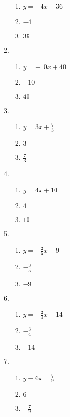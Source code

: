 \documentclass[a4paper,12pt]{article}
\begin{document}
\begin{enumerate}
\begin{multicols}{2}
\begin{enumerate}
\begin{enumerate}
        \item $y = -4x + 36$
        \item $-4$
        \item $36$
        \end{enumerate}
    \item
        \begin{enumerate}
        \item $y = -10x + 40$
        \item $-10$
        \item $40$
        \end{enumerate}
    \item
        \begin{enumerate}
        \item $y = 3x + \frac{7}{3}$
        \item $3$
        \item $\frac{7}{3}$
        \end{enumerate}
    \item
        \begin{enumerate}
        \item $y = 4x + 10$
        \item $4$
        \item $10$
        \end{enumerate}
    \item
        \begin{enumerate}
        \item $y = -\frac{3}{5}x - 9$
        \item $-\frac{3}{5}$
        \item $-9$
        \end{enumerate}
    \item
        \begin{enumerate}
        \item $y = -\frac{3}{4}x - 14$
        \item $-\frac{3}{4}$
        \item $-14$
        \end{enumerate}
    \item
        \begin{enumerate}
        \item $y = 6x - \frac{7}{9}$
        \item $6$
        \item $-\frac{7}{9}$
        \end{enumerate}
    \end{enumerate}
    \end{multicols}

\end{enumerate}
\end{document}
